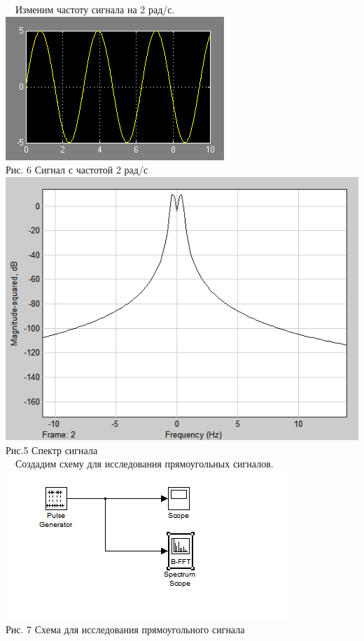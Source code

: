 \documentclass[a4paper]{article}
\begin{document}
~\
\flushleft Изменим частоту сигнала на 2 рад/с.
\center\includegraphics[scale = 1]{sin_sim2.png} \\ Рис. 6 Сигнал с частотой 2 рад/с \\ 
\center\includegraphics[scale = 0.7]{sin_sim_spectrum2.png} \\ Рис.5 Спектр сигнала \\

~\
\flushleft Создадим схему для исследования прямоугольных сигналов.
\center\includegraphics[scale = 1]{scheme2.png} \\ Рис. 7 Схема для исследования прямоугольного сигнала \\
\end{document}
